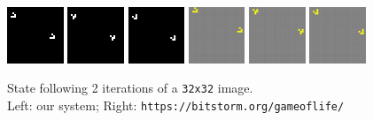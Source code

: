 \documentclass{article}
\begin{document}
    \begin{figure}[h]
        \begin{center}
            \includegraphics[width=0.15\textwidth]{test32.png}
            \includegraphics[width=0.15\textwidth]{testout32-1.png}
            \includegraphics[width=0.15\textwidth]{testout32-2.png}
            \includegraphics[width=0.15\textwidth]{verify32.png}
            \includegraphics[width=0.15\textwidth]{verify32-1.png}
            \includegraphics[width=0.15\textwidth]{verify32-2.png}
            \caption{State following 2 iterations of a \texttt{32x32} image. \\ Left: our system; Right: \texttt{https://bitstorm.org/gameoflife/}}
            \label{fig:test32}
        \end{center}
    \end{figure}
\end{document}
